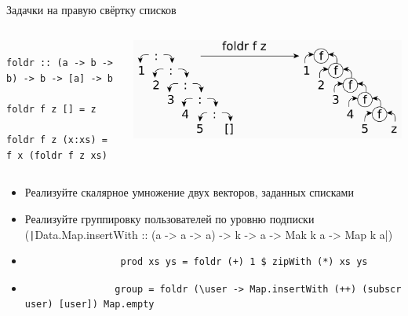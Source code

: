     \begin{frame}[fragile]{Задачки на правую свёртку списков}
        \vspace{-1em}
        \begin{columns}[onlytextwidth]
            \begin{column}{0.485\textwidth}
                \begin{verbatim}
                    foldr :: (a -> b -> b) -> b -> [a] -> b
                    foldr f z [] = z
                    foldr f z (x:xs) = f x (foldr f z xs)
                \end{verbatim}
            \end{column}\hfill%
            \begin{column}{0.5\textwidth}
                \begin{center}
                    \includegraphics[width=1\textwidth]{figs/foldr}
                \end{center}
            \end{column}
        \end{columns}
        \vspace{0.5em}
        \begin{itemize}
            \item[\todo] Реализуйте скалярное умножение двух векторов, заданных списками
            \item[\todo] Реализуйте группировку пользователей по уровню подписки (\texttt|Data.Map.insertWith :: (a -> a -> a) -> k -> a -> Mak k a -> Map k a|)
            \item[\answer] \pause
             \begin{verbatim}
                 prod xs ys = foldr (+) 1 $ zipWith (*) xs ys
             \end{verbatim}
            \item[\answer] \pause
            \begin{verbatim}
                group = foldr (\user -> Map.insertWith (++) (subscr user) [user]) Map.empty
            \end{verbatim}
        \end{itemize}
    \end{frame}


